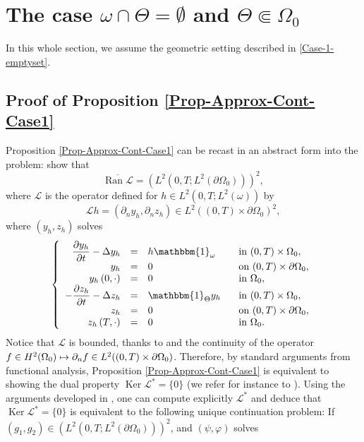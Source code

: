 \documentclass[JEP,XML,SOM,Unicode,NoFloatCountersInSection]{cedram}
\newcommand\mto{\mathchoice{\longmapsto}{\mapsto}{\mapsto}{\mapsto}}
\DeclareMathOperator{\Ker}{Ker}
\DeclareMathOperator{\Ran}{Ran}
\theoremstyle{definition}
\begin{document}
\section{The case \texorpdfstring{$\omega \cap \Theta = \emptyset$ and $\Theta \Subset \Omega_0$}{om}}
\label{Sec-Omega-Theta-Empty}
In this whole section, we assume the geometric setting described in \eqref{Case-1-emptyset}.

\subsection{Proof of Proposition \ref{Prop-Approx-Cont-Case1}}\label{Subsec-Proof-ApproxCont-Case1}
Proposition \ref{Prop-Approx-Cont-Case1} can be recast in an abstract form into the problem: show that
\[
\overline{ \Ran \mathcal{L} } = (L^2(0,T; L^2(\partial\Omega_0)))^2,
\]
where $\mathcal{L}$ is the operator defined for $h \in L^2(0,T; L^2(\omega))$ by
\[
\mathcal{L} h = (\partial_n y_h, \partial_n z_h)\in L^2((0,T)\times\partial\Omega_0)^2,
\]
where $(y_h,z_h)$ solves
\begin{equation}\label{csanss}
\left\{
\begin{array}{rcll}
\dfrac{\partial y_h}{\partial t}-\Delta y_h &=&h\mathbbm{1}_{\omega}\quad&\text{ in }(0,T) \times \Omega_0,
\\
y_h &=& 0 &\text{ on }(0,T) \times \partial \Omega_0,
\\
y_h\left(0,\cdot\right) &=& 0 &\text{ in }\Omega_0,
\\
-\dfrac{\partial z_h}{\partial t}-\Delta z_h &=&\mathbbm{1}_{\Theta}y_h &\text{ in }(0,T) \times \Omega_0,
\\
z_h &=& 0 &\text{ on }(0,T) \times \partial \Omega_0,
\\
z_h\left(T,\cdot\right) &=& 0 &\text{ in }\Omega_0.
\end{array}
\right.
\end{equation}
Notice that $\mathcal L$ is bounded, thanks to \cite[Th.\,5, p.\,382]{Evans} and the continuity of the operator $f\in H^2(\Omega_0) \mto \partial_n f\in L^2((0,T)\times\partial\Omega_0)$.
Therefore, by standard arguments from functional analysis, Proposition \ref{Prop-Approx-Cont-Case1} is equivalent to showing the dual property $\Ker\mathcal{L}^* = \{0\}$ (we refer for instance to \cite[Cor.\,2.18]{Brezis}). Using the arguments developed in \cite[Prop.\,2.1]{Lissy-Privat-Simpore}, one can compute explicitly $\mathcal L^*$ and deduce that $\Ker\mathcal{L}^* = \{0\}$ is equivalent to the following unique continuation problem: If $(g_1, g_2) \in (L^2(0,T; L^2(\partial\Omega_0)))^2$, and $(\psi, \varphi)$ solves
\end{document}
